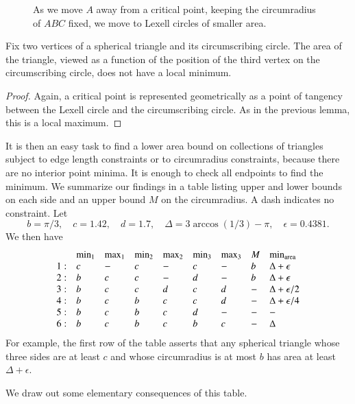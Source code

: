 \begin{figure}[htb]
  \centering
  \caption{As we move $A$ away from a critical
point, keeping the circumradius of $ABC$ fixed, we move to Lexell
circles of smaller area.}
  \label{fig:13:B}
\end{figure}

\begin{lemma} Fix two vertices of a spherical triangle
and its circumscribing circle.  The area of the triangle, viewed
as a function of the position of the third vertex on the
circumscribing circle, does not have a local minimum.
\end{lemma}

\begin{proof}  Again, a critical point is represented
geometrically as a point of tangency between the Lexell circle and
the circumscribing circle.  As in the previous lemma, this is a
local maximum.
\end{proof}

It is then an easy task to find a lower area bound on collections
of triangles subject to edge length constraints or to circumradius
constraints, because there are no interior point minima.  It is
enough to check all endpoints to find the minimum.  We summarize
our findings in a table listing upper and lower bounds on each
side and an upper bound $M$ on the circumradius.  A dash indicates
no constraint.  Let
    $$
    b = \pi/3, \quad c = 1.42, \quad d = 1.7,\quad
    \Delta = 3\arccos(1/3)-\pi,\quad \epsilon = 0.4381.
    $$
We then have
$$
    \begin{array}{lllllllll}
 &\min_1&\max_1&\min_2&\max_2&\min_3&\max_3&M    &\min_{{\operatorname{area}}}\\
 1:&c &- &c &- &c &- &b &\Delta+\epsilon\\
 2:&b &c &c &- &d &- &b &\Delta+\epsilon\\
 3:&b &c &c &d &c &d &- &\Delta+\epsilon/2\\
 4:&b &c &b &c &c &d &- &\Delta+\epsilon/4\\
 5:&b &c &b &c &d &- &- &-\\
 6:&b &c &b &c &b &c &- &\Delta
    \end{array}
$$
For example, the first row of the table 
asserts that any spherical triangle whose three sides are at least
$c$ and whose circumradius is at most $b$ has area at least $\Delta+\epsilon$.

We draw out some elementary consequences of this table.

